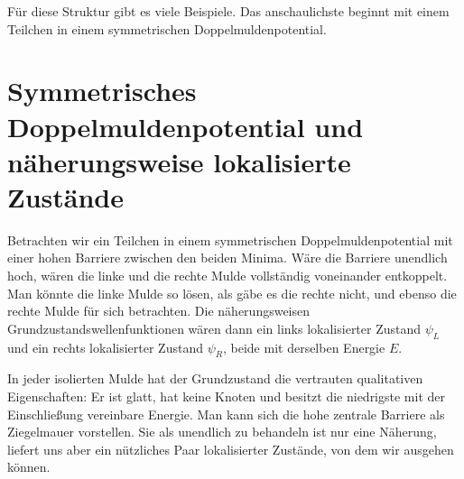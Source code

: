 Für diese Struktur gibt es viele Beispiele. Das anschaulichste beginnt mit einem Teilchen in einem symmetrischen Doppelmuldenpotential.

\section{Symmetrisches Doppelmuldenpotential und näherungsweise lokalisierte Zustände}

Betrachten wir ein Teilchen in einem symmetrischen Doppelmuldenpotential mit einer hohen Barriere zwischen den beiden Minima. Wäre die Barriere unendlich hoch, wären die linke und die rechte Mulde vollständig voneinander entkoppelt. Man könnte die linke Mulde so lösen, als gäbe es die rechte nicht, und ebenso die rechte Mulde für sich betrachten. Die näherungsweisen Grundzustandswellenfunktionen wären dann ein links lokalisierter Zustand \(\psi_L\) und ein rechts lokalisierter Zustand \(\psi_R\), beide mit derselben Energie \(E\).

In jeder isolierten Mulde hat der Grundzustand die vertrauten qualitativen Eigenschaften: Er ist glatt, hat keine Knoten und besitzt die niedrigste mit der Einschließung vereinbare Energie. Man kann sich die hohe zentrale Barriere als Ziegelmauer vorstellen. Sie als unendlich zu behandeln ist nur eine Näherung, liefert uns aber ein nützliches Paar lokalisierter Zustände, von dem wir ausgehen können.

